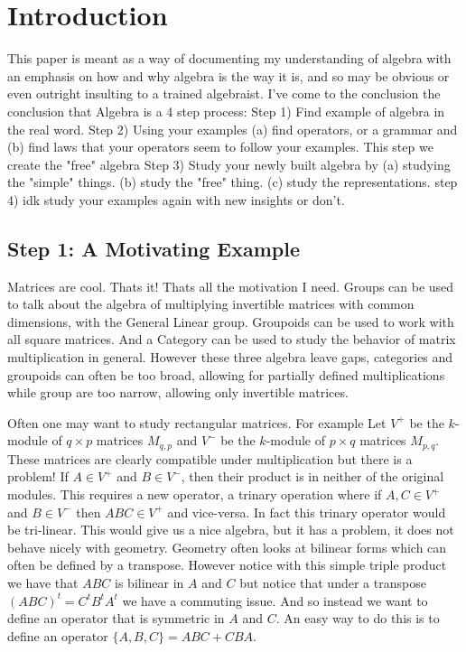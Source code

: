 \section{Introduction}
This paper is meant as a way of documenting my understanding of 
algebra with an emphasis on how and why algebra is the way it is, 
and so may be obvious or even outright insulting to a trained algebraist.
I've come to the conclusion the conclusion that Algebra is a 4 step process:
Step 1) Find example of algebra in the real word. 
Step 2) Using your examples (a) find operators, or a grammar and (b) find laws that your operators seem to follow your examples. This step we create the "free" algebra
Step 3) Study your newly built algebra by (a) studying the "simple" things. (b) study the "free" thing. (c) study the representations.
step 4) idk study your examples again with new insights or don't.

\subsection{Step 1: A Motivating Example}
Matrices are cool. Thats it! Thats all the motivation I need.
Groups can be used to talk about the algebra of multiplying 
invertible matrices with common dimensions, with the General Linear group.
Groupoids can be used to work with all square matrices. And a Category can be 
used to study the behavior of matrix multiplication in general. However these 
three algebra leave gaps, categories and groupoids can often be too broad, allowing
for partially defined multiplications while group are too narrow, allowing only 
invertible matrices.

Often one may want to study rectangular matrices. For example Let $V^+$ be the 
$k$-module of $q\times p$ matrices $M_{q,p}$ and $V^-$ be the 
$k$-module of $p\times q$ matrices $M_{p,q}$. These matrices are clearly compatible under 
multiplication but there is a problem! If $A\in V^+$ and $B\in V^-$, then their product is in neither
of the original modules. This requires a new operator, a trinary operation where if $A,C\in V^+$ and $B\in V^-$
then $ABC\in V^+$ and vice-versa. In fact this trinary operator would be tri-linear.
This would give us a nice algebra, but it has a problem, it does not behave nicely with geometry.
Geometry often looks at bilinear forms which can often be defined by a transpose. 
However notice with this simple triple product we have that $ABC$ is bilinear in $A$ and $C$ but notice that 
under a transpose $(ABC)^t=C^tB^tA^t$ we have a commuting issue. And so instead we want to define an operator
that is symmetric in $A$ and $C$. An easy way to do this is to define an operator $\{A,B,C\}=ABC+CBA$.


